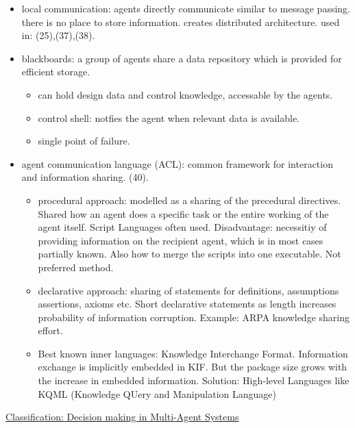 \begin{itemize}[noitemsep,nolistsep]
	\item local communication: agents directly communicate similar to message passing. there is no place to store information. creates distributed architecture. used in: (25),(37),(38).
	\item blackboards: a group of agents share a data repository which is provided for efficient storage.
	\begin{itemize}[noitemsep,nolistsep]
		\item can hold design data and control knowledge, accessable by the agents.
		\item control shell: notfies the agent when relevant data is available.
		\item single point of failure.
	\end{itemize}
	\item agent communication language (ACL): common framework for interaction and information sharing. (40).
	\begin{itemize}[noitemsep,nolistsep]
		\item procedural approach: modelled as a sharing of the precedural directives. Shared how an agent does a specific task or the entire working of the agent itself. Script Languages often used. Disadvantage: necessitiy of providing information on the recipient agent, which is in most cases partially known. Also how to merge the scripts into one executable. Not preferred method.
		\item declarative approach: sharing of statements for definitions, assumptions assertions, axioms etc. Short declarative statements as length increases probability of information corruption. Example: ARPA knowledge sharing effort.
		\item Best known inner languages: Knowledge Interchange Format. Information exchange is implicitly embedded in KIF. But the package size grows with the increase in embedded information. Solution: High-level Languages like KQML (Knowledge QUery and Manipulation Language)
	\end{itemize}
\end{itemize}
\underline{Classification: Decision making in Multi-Agent Systems}
